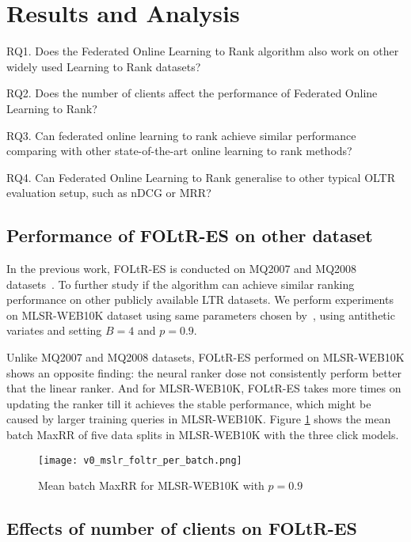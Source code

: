 \section{Results and Analysis}

RQ1. Does the Federated Online Learning to Rank algorithm also work on other widely used Learning to Rank datasets?

RQ2. Does the number of clients affect the performance of Federated Online Learning to Rank?

RQ3. Can federated online learning to rank achieve similar performance comparing with other state-of-the-art online learning to rank methods?

RQ4. Can Federated Online Learning to Rank generalise to other typical OLTR evaluation setup, such as nDCG or MRR?

\subsection{Performance of FOLtR-ES on other dataset}

In the previous work, FOLtR-ES is conducted on MQ2007 and MQ2008 datasets~\cite{kharitonov2019federated}. To further study if the algorithm can achieve similar ranking performance on other publicly available LTR datasets. We perform experiments on MLSR-WEB10K dataset using same parameters chosen by~\cite{kharitonov2019federated}, using antithetic variates and setting $B = 4$ and $p = 0.9$. 

Unlike MQ2007 and MQ2008 datasets, FOLtR-ES performed on MLSR-WEB10K shows an opposite finding: the neural ranker dose not consistently perform better that the linear ranker. And for MLSR-WEB10K, FOLtR-ES takes more times on updating the ranker till it achieves the stable performance, which might be caused by larger training queries in MLSR-WEB10K. Figure \ref{fig: mslr-v0} shows the mean batch MaxRR of five data splits in MLSR-WEB10K with the three click models.

\begin{figure}[H]
	\centering
	\texttt{[image: v0\_mslr\_foltr\_per\_batch.png]}
	\caption{Mean batch MaxRR for MLSR-WEB10K with $p = 0.9$}
	\label{fig: mslr-v0}
\end{figure}


\subsection{Effects of number of clients on FOLtR-ES}

